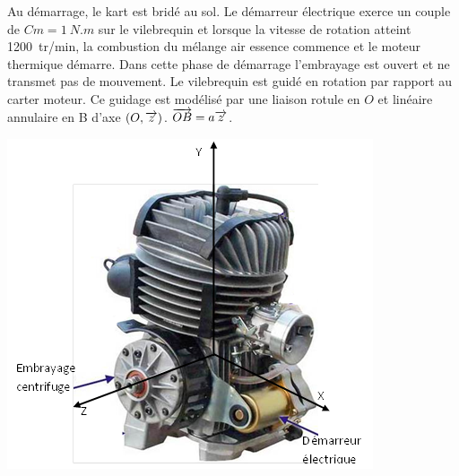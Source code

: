 \documentclass[10pt,fleqn]{article} %
\begin{document}
\def\pathfig{images}

\vspace{5cm}
\pagestyle{fancy}
\thispagestyle{plain}

\def\columnseprulecolor{\color{ocre}}
\setlength{\columnseprule}{0.4pt} 

\def\pathfig{images}

\ifprof
\else
\begin{multicols}{2}
\fi


Au démarrage, le kart est bridé au sol. Le démarreur électrique exerce un couple de $Cm = \SI{1}{N.m}$ sur le vilebrequin et lorsque la vitesse de rotation atteint \SI{1200}{tr/min}, la combustion du mélange air essence commence et le moteur thermique démarre. Dans cette phase de démarrage l’embrayage est ouvert et ne transmet pas de mouvement.
Le vilebrequin est guidé en rotation par rapport au carter moteur. Ce guidage est modélisé par une liaison rotule en $O$ et linéaire annulaire en B d’axe $\left(O,\overrightarrow{z}\right)$. $\overrightarrow{OB}=a\overrightarrow{z}$.


\begin{center}
\includegraphics[width=\linewidth]{images/fig_01}
\end{center}


\end{multicols}
\end{document}
